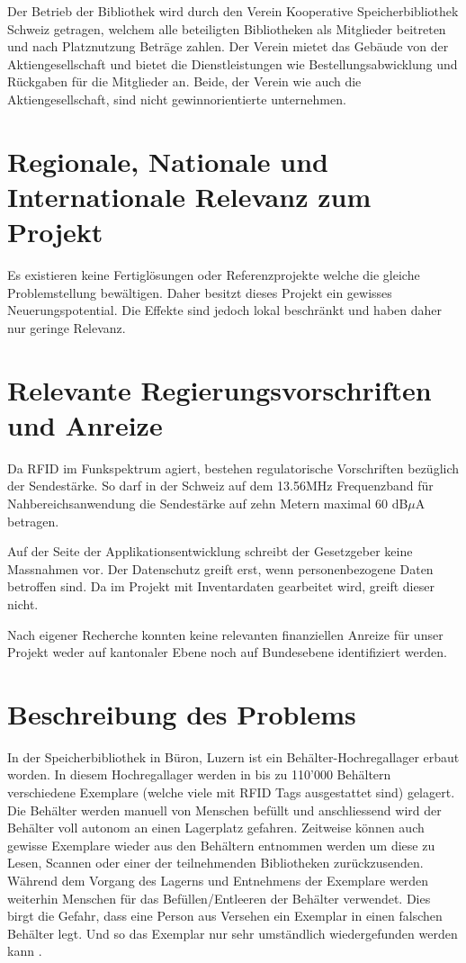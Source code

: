 Der Betrieb der Bibliothek wird durch den Verein Kooperative Speicherbibliothek Schweiz getragen, welchem alle beteiligten Bibliotheken als Mitglieder beitreten und nach Platznutzung Beträge zahlen. Der Verein mietet das Gebäude von der Aktiengesellschaft und bietet die Dienstleistungen wie Bestellungsabwicklung und Rückgaben für die Mitglieder an. Beide, der Verein wie auch die Aktiengesellschaft, sind nicht gewinnorientierte unternehmen.

\section{Regionale, Nationale und Internationale Relevanz zum Projekt}
Es existieren keine Fertiglösungen oder Referenzprojekte welche die gleiche Problemstellung bewältigen. Daher besitzt dieses Projekt ein gewisses Neuerungspotential. Die Effekte sind jedoch lokal beschränkt und haben daher nur geringe Relevanz.

\section{Relevante Regierungsvorschriften und Anreize}
Da RFID im Funkspektrum agiert, bestehen regulatorische Vorschriften bezüglich der Sendestärke. So darf in der Schweiz auf dem 13.56MHz Frequenzband für Nahbereichsanwendung die Sendestärke auf zehn Metern maximal 60 dB$\mu$A betragen.

Auf der Seite der Applikationsentwicklung schreibt der Gesetzgeber keine Massnahmen vor. Der Datenschutz greift erst, wenn personenbezogene Daten betroffen sind. Da im Projekt mit Inventardaten gearbeitet wird, greift dieser nicht.

Nach eigener Recherche konnten keine relevanten finanziellen Anreize für unser Projekt weder auf kantonaler Ebene noch auf Bundesebene identifiziert werden.

\section{Beschreibung des Problems}
In der Speicherbibliothek in Büron, Luzern ist ein Behälter-Hochregallager erbaut worden. In diesem Hochregallager werden in bis zu 110'000 Behältern verschiedene Exemplare (welche viele mit RFID Tags ausgestattet sind) gelagert. Die Behälter werden manuell von Menschen befüllt und anschliessend wird der Behälter voll autonom an einen Lagerplatz gefahren. Zeitweise können auch gewisse Exemplare wieder aus den Behältern entnommen werden um diese zu Lesen, Scannen oder einer der teilnehmenden Bibliotheken zurückzusenden. Während dem Vorgang des Lagerns und Entnehmens der Exemplare werden weiterhin Menschen für das Befüllen/Entleeren der Behälter verwendet. Dies birgt die Gefahr, dass eine Person aus Versehen ein Exemplar in einen falschen Behälter legt. Und so das Exemplar nur sehr umständlich wiedergefunden werden kann \parencite{HochschuleLuzern2019}.

